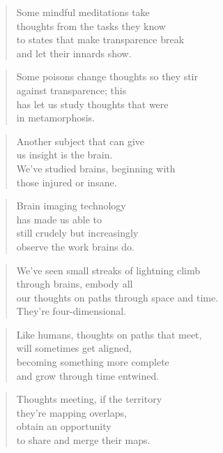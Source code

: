 \documentclass[10pt,a4paper]{article}
\begin{document}
\begin{multicols}{2}
\begin{verse}
Some mindful meditations take\\
thoughts from the tasks they know\\
to states that make transparence break\\
and let their innards show.
\end{verse}

\begin{verse}
Some poisons change thoughts so they stir\\
against transparence; this\\
has let us study thoughts that were\\
in metamorphosis.
\end{verse}

\begin{verse}
Another subject that can give\\
us insight is the brain.\\
We’ve studied brains, beginning with\\
those injured or insane.
\end{verse}

\begin{verse}
Brain imaging technology\\
has made us able to\\
still crudely but increasingly\\
observe the work brains do.
\end{verse}

\begin{verse}
We’ve seen small streaks of lightning climb\\
through brains, embody all\\
our thoughts on paths through space and time.\\
They’re four-dimensional.
\end{verse}

\begin{verse}
Like humans, thoughts on paths that meet,\\
will sometimes get aligned,\\
becoming something more complete\\
and grow through time entwined.
\end{verse}

\begin{verse}
Thoughts meeting, if the territory\\
they’re mapping overlaps,\\
obtain an opportunity\\
to share and merge their maps.
\end{verse}


\end{multicols}
\end{document}
